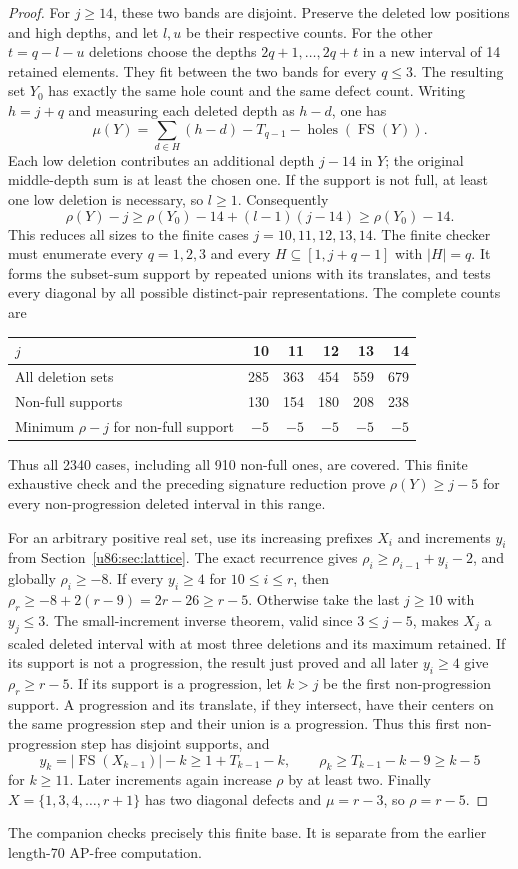 \documentclass[11pt,a4paper]{article}
\theoremstyle{remark}
\newcommand{\FS}{\operatorname{FS}}
\begin{document}
\begin{proof}
For $j\ge14$, these two bands are disjoint. Preserve the deleted low
positions and high depths, and let $l,u$ be their respective counts.
For the other $t=q-l-u$ deletions choose the depths
$2q+1,\ldots,2q+t$ in a new interval of 14 retained elements.
They fit between the two bands for every $q\le3$. The resulting set
$Y_0$ has exactly the same hole count and the same defect count.
Writing $h=j+q$ and measuring each deleted depth as $h-d$, one has
\[
 \mu(Y)=\sum_{d\in H}(h-d)-T_{q-1}-\operatorname{holes}(\FS(Y)).
\]
Each low deletion contributes an additional depth $j-14$ in $Y$;
the original middle-depth sum is at least the chosen one. If the
support is not full, at least one low deletion is necessary, so $l\ge1$.
Consequently
\[
 \rho(Y)-j\ge\rho(Y_0)-14+(l-1)(j-14)\ge\rho(Y_0)-14.
\]
This reduces all sizes to the finite cases $j=10,11,12,13,14$.
The finite checker must enumerate every $q=1,2,3$ and every
$H\subseteq[1,j+q-1]$ with $|H|=q$. It forms the subset-sum support
by repeated unions with its translates, and tests every diagonal by
all possible distinct-pair representations. The complete counts are
\begin{center}\small
\begin{tabular}{lrrrrr}
\toprule
$j$&10&11&12&13&14\\\midrule
All deletion sets&285&363&454&559&679\\
Non-full supports&130&154&180&208&238\\
Minimum $\rho-j$ for non-full support&$-5$&$-5$&$-5$&$-5$&$-5$\\\bottomrule
\end{tabular}
\end{center}
Thus all 2340 cases, including all 910 non-full ones, are covered.
This finite exhaustive check and the preceding signature reduction prove
$\rho(Y)\ge j-5$ for every non-progression deleted interval in this range.

For an arbitrary positive real set, use its increasing prefixes $X_i$
and increments $y_i$ from Section~\ref{u86:sec:lattice}. The exact
recurrence gives $\rho_i\ge\rho_{i-1}+y_i-2$, and globally
$\rho_i\ge-8$. If every $y_i\ge4$ for $10\le i\le r$, then
$\rho_r\ge-8+2(r-9)=2r-26\ge r-5$.
Otherwise take the last $j\ge10$ with $y_j\le3$. The
small-increment inverse theorem, valid since $3\le j-5$, makes $X_j$
a scaled deleted interval with at most three deletions and its maximum
retained. If its support is not a progression, the result just proved
and all later $y_i\ge4$ give $\rho_r\ge r-5$.
If its support is a progression, let $k>j$ be the first non-progression
support. A progression and its translate, if they intersect, have their
centers on the same progression step and their union is a progression.
Thus this first non-progression step has disjoint supports, and
\[
 y_k=|\FS(X_{k-1})|-k\ge1+T_{k-1}-k,
 \qquad\rho_k\ge T_{k-1}-k-9\ge k-5
\]
for $k\ge11$. Later increments again increase $\rho$ by at least two.
Finally $X=\{1,3,4,\ldots,r+1\}$ has two diagonal defects and
$\mu=r-3$, so $\rho=r-5$.
\end{proof}
The companion  checks precisely this
finite base. It is separate from the earlier length-70 AP-free computation.
\end{document}
